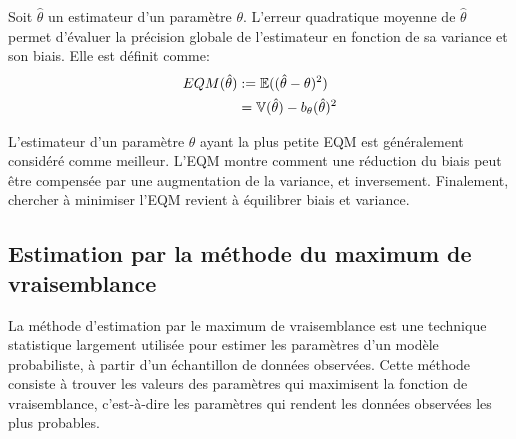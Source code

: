 \begin{definition}
    Soit $\hat{\theta}$ un estimateur d'un paramètre $\theta$. L'erreur quadratique moyenne de $\hat{\theta}$ 
    permet d'évaluer la précision globale de l'estimateur en fonction de sa variance et son biais. 
    Elle est définit comme: 
        \begin{align*}
            EQM(\hat{\theta}) &:= \mathbb{E}((\hat{\theta} - \theta)^2) \\ 
            &= \mathbb{V}(\hat{\theta}) - b_\theta(\hat{\theta})^2
        \end{align*}
\end{definition}

\begin{remark}[Interprétation]
    L'estimateur d'un paramètre $\theta$ ayant la plus petite EQM est généralement considéré comme meilleur.
    L'EQM montre comment une réduction du biais peut être compensée par une augmentation de la variance, et inversement.
    Finalement, chercher à minimiser l'EQM revient à équilibrer biais et variance.
\end{remark}

\subsection{Estimation par la méthode du maximum de vraisemblance}

La méthode d'estimation par le maximum de vraisemblance est une technique statistique largement 
utilisée pour estimer les paramètres d'un modèle probabiliste, à partir d'un échantillon de données observées. 
Cette méthode consiste à trouver les valeurs des paramètres qui maximisent la fonction de vraisemblance, 
c'est-à-dire les paramètres qui rendent les données observées les plus probables.


